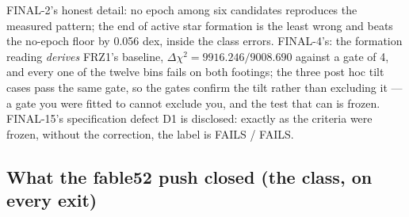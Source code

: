 \documentclass[10pt]{article}
\begin{document}
FINAL-2's honest detail: no epoch among six candidates reproduces the measured pattern; the end of active star
formation is the least wrong and beats the no-epoch floor by 0.056 dex, inside the class errors. FINAL-4's: the
formation reading {\it derives} FRZ1's baseline, $\Delta\chi^2=9916.246/9008.690$ against a gate of 4, and every
one of the twelve bins fails on both footings; the three post hoc tilt cases pass the same gate, so the gates
confirm the tilt rather than excluding it --- a gate you were fitted to cannot exclude you, and the test that
can is frozen. FINAL-15's specification defect D1 is disclosed: exactly as the criteria were frozen, without
the correction, the label is FAILS / FAILS.

\subsection{What the fable52 push closed (the class, on every exit)}
\end{document}

